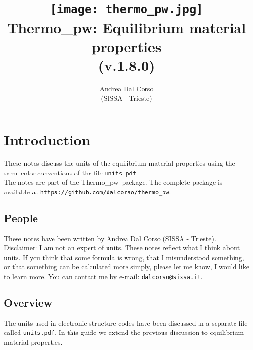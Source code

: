 \documentclass[12pt,a4paper,twoside]{report}
\def\version{1.8.0}
\def\tpw{{\sc Thermo\_pw}}
\begin{document}
 

\author{Andrea Dal Corso \\ (SISSA - Trieste)}
\date{}

\title{
  \texttt{[image: thermo\_pw.jpg]} \\
  \vspace{3truecm}
  \Huge \color{dark-blue} {\sc Thermo\_pw}: Equilibrium material properties \\ (v.\version)
}

\maketitle

\newpage

\tableofcontents

\newpage

{\color{dark-blue}\chapter{Introduction}}
\color{black}

These notes discuss the units of the equilibrium material properties
using the same color conventions of the file \texttt{units.pdf}.\\
The notes are part of the \tpw\ package. The complete package is
available at \texttt{https://github.com/dalcorso/thermo\_pw}.


\newpage
{\color{coral}\section{People}}
\color{black}

These notes have been written by Andrea Dal Corso (SISSA - Trieste). \\
Disclaimer: I am not an expert of units. 
These notes reflect what I think about units.
If you think that some formula is wrong, that I misunderstood something, or 
that something can be calculated more simply, please let me know, I would 
like to learn more. 
You can contact me by e-mail: \texttt{dalcorso@sissa.it}. 

\newpage
{\color{coral}\section{Overview}}
\color{black}
The units used in electronic structure codes have been
discussed in a separate file called \texttt{units.pdf}. In this guide
we extend the previous discussion to equilibrium material properties.
\end{document}
